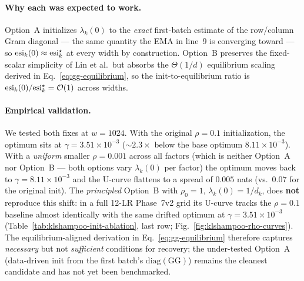 \paragraph{Why each was expected to work.} Option~A initializes $\lambda_k(0)$ to the
\emph{exact} first-batch estimate of the row/column Gram diagonal --- the
same quantity the EMA in line~9 is converging toward --- so
$\mathrm{esi}_k(0)\approx\mathrm{esi}_k^{\star}$ at every width by construction.
Option~B preserves the fixed-scalar simplicity of Lin et al.\ but absorbs
the $\Theta(1/d)$ equilibrium scaling derived in
Eq.~\eqref{eq:gg-equilibrium}, so the init-to-equilibrium ratio is
$\mathrm{esi}_k(0)/\mathrm{esi}_k^{\star} = \mathcal{O}(1)$ across widths.

\paragraph{Empirical validation.} We tested both fixes at $w{=}1024$.
With the original $\rho{=}0.1$ initialization, the optimum sits at
$\gamma{=}3.51\!\times\!10^{-3}$ ($\sim\!2.3\!\times$ below the base
optimum $8.11\!\times\!10^{-3}$). With a \emph{uniform} smaller
$\rho{=}0.001$ across all factors (which is neither Option~A nor
Option~B --- both options vary $\lambda_k(0)$ per factor) the optimum
moves back to $\gamma{=}8.11\!\times\!10^{-3}$ and the U-curve flattens
to a spread of $0.005$ nats (vs.\ $0.07$ for the original init). The
\emph{principled} Option~B with $\rho_0{=}1$, $\lambda_k(0){=}1/d_k$,
does \textbf{not} reproduce this shift: in a full 12-LR Phase~7v2 grid
its U-curve tracks the $\rho{=}0.1$ baseline almost identically with
the same drifted optimum at $\gamma{=}3.51\!\times\!10^{-3}$
(Table~\ref{tab:klshampoo-init-ablation}, last row;
Fig.~\ref{fig:klshampoo-rho-curves}). The equilibrium-aligned
derivation in Eq.~\eqref{eq:gg-equilibrium} therefore captures
\emph{necessary} but not \emph{sufficient} conditions for recovery;
the under-tested Option~A (data-driven init from the first batch's
$\mathrm{diag}(\mathrm{GG})$) remains the cleanest candidate and has not
yet been benchmarked.

